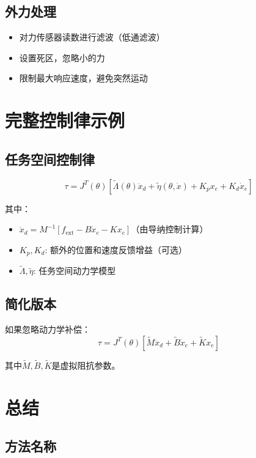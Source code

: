 \documentclass[12pt,a4paper]{article}
\begin{document}
\subsection{外力处理}

\begin{itemize}
\item 对力传感器读数进行滤波（低通滤波）
\item 设置死区，忽略小的力
\item 限制最大响应速度，避免突然运动
\end{itemize}

\section{完整控制律示例}

\subsection{任务空间控制律}

\begin{equation}
\tau = J^T(\theta)\left[\tilde{\Lambda}(\theta)\ddot{x}_d + \tilde{\eta}(\theta, \dot{x}) + K_p x_e + K_d \dot{x}_e\right]
\end{equation}

其中：
\begin{itemize}
\item $\ddot{x}_d = M^{-1}[f_{\text{ext}} - B\dot{x}_e - Kx_e]$（由导纳控制计算）
\item $K_p, K_d$: 额外的位置和速度反馈增益（可选）
\item $\tilde{\Lambda}, \tilde{\eta}$: 任务空间动力学模型
\end{itemize}

\subsection{简化版本}

如果忽略动力学补偿：
\begin{equation}
\tau = J^T(\theta)\left[\tilde{M}\ddot{x}_d + \tilde{B}\dot{x}_e + \tilde{K}x_e\right]
\end{equation}

其中$\tilde{M}, \tilde{B}, \tilde{K}$是虚拟阻抗参数。

\section{总结}

\subsection{方法名称}
\end{document}
